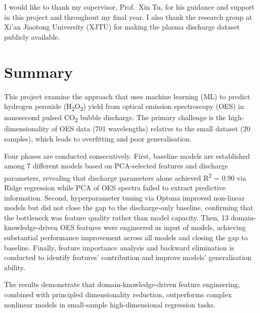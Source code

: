 \documentclass[12pt, a4paper]{article}
\begin{document}
I would like to thank my supervisor, Prof.\ Xin Tu, for his guidance and support in this project and throughout my final year. I also thank the research group at Xi'an Jiaotong University (XJTU) for making the plasma discharge dataset publicly available.

\newpage
\section*{Summary}


This project examine the approach that uses machine learning (ML) to predict hydrogen peroxide (H\textsubscript{2}O\textsubscript{2}) yield from optical emission spectroscopy (OES) in nanosecond pulsed CO\textsubscript{2} bubble discharge. The primary challenge is the high-dimensionality of OES data (701 wavelengths) relative to the small dataset (20 samples), which leads to overfitting and poor generalisation.

Four phases are conducted consecutively. First, baseline models are established among 7 different models based on PCA-selected features and discharge parameters, revealing that discharge parameters alone achieved R\textsuperscript{2} = 0.90 via Ridge regression while PCA of OES spectra failed to extract predictive information. Second, hyperparameter tuning via Optuna improved non-linear models but did not close the gap to the discharge-only baseline, confirming that the bottleneck was feature quality rather than model capacity. Then, 13 domain-knowledge-driven OES features were engineered as input of models, achieving substantial performance improvement across all models and closing the gap to baseline. Finally, feature importance analysis and backward elimination is conducted to identify features' contribution and improve models' generalisation ability. 

The results demonstrate that domain-knowledge-driven feature engineering, combined with principled dimensionality reduction, outperforms complex nonlinear models in small-sample high-dimensional regression tasks.


\newpage
\tableofcontents

\newpage
\listoffigures

\listoftables

\newpage
\end{document}
